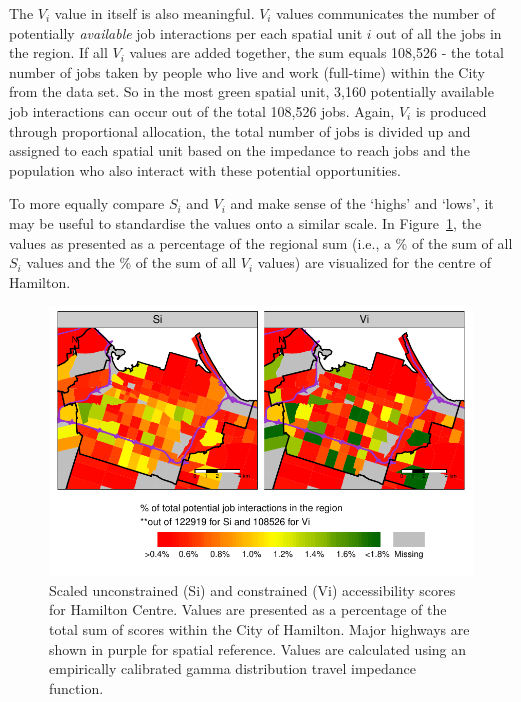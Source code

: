 \documentclass[12pt, oneside]{report}
\begin{document}
The \(V_i\) value in itself is also meaningful. \(V_i\) values
communicates the number of potentially \emph{available} job interactions
per each spatial unit \(i\) out of all the jobs in the region. If all
\(V_i\) values are added together, the sum equals 108,526 - the total
number of jobs taken by people who live and work (full-time) within the
City from the data set. So in the most green spatial unit, 3,160
potentially available job interactions can occur out of the total
108,526 jobs. Again, \(V_i\) is produced through proportional
allocation, the total number of jobs is divided up and assigned to each
spatial unit based on the impedance to reach jobs and the population who
also interact with these potential opportunities.

To more equally compare \(S_i\) and \(V_i\) and make sense of the
`highs' and `lows', it may be useful to standardise the values onto a
similar scale. In Figure~\ref{fig-perc-con-and-unconstrained-access},
the values as presented as a percentage of the regional sum (i.e., a \%
of the sum of all \(S_i\) values and the \% of the sum of all \(V_i\)
values) are visualized for the centre of Hamilton.

\begin{figure}

{\centering \includegraphics{tools-report_files/figure-pdf/fig-perc-con-and-unconstrained-access-1.pdf}

}

\caption{\label{fig-perc-con-and-unconstrained-access}Scaled
unconstrained (Si) and constrained (Vi) accessibility scores for
Hamilton Centre. Values are presented as a percentage of the total sum
of scores within the City of Hamilton. Major highways are shown in
purple for spatial reference. Values are calculated using an empirically
calibrated gamma distribution travel impedance function.}

\end{figure}
\end{document}
